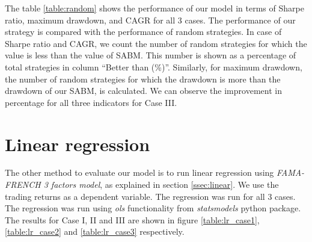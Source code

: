 The table \ref{table:random} shows the performance of our model in terms of Sharpe ratio, maximum drawdown, and CAGR for all 3 cases. The performance of our strategy is compared with the performance of random strategies. In case of Sharpe ratio and CAGR, we count the number of random strategies for which the value is less than the value of SABM. This number is shown as a percentage of total strategies in column ``Better than (\%)''. Similarly, for maximum drawdown, the number of random strategies for which the drawdown is more than the drawdown of our SABM, is calculated. We can observe the improvement in percentage for all three indicators for Case III. 


\section{Linear regression}
The other method to evaluate our model is to run linear regression using \textit{FAMA-FRENCH 3 factors model}, as explained in section \ref{ssec:linear}.
We use the trading returns as a dependent variable. The regression was run for all 3 cases. The regression was run using \textit{ols} functionality from \textit{statsmodels} python package. The results for Case I, II and III are shown in figure \ref{table:lr_case1}, \ref{table:lr_case2} and \ref{table:lr_case3} respectively.



